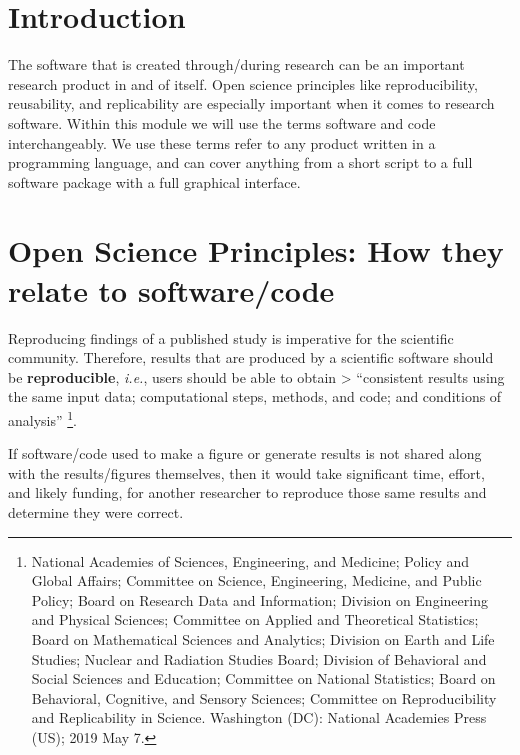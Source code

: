 \documentclass[
  letterpaper,
  DIV=11,
  numbers=noendperiod]{scrreport}
\begin{document}
\hypertarget{introduction-4}{%
\section{Introduction}\label{introduction-4}}

The software that is created through/during research can be an important
research product in and of itself. Open science principles like
reproducibility, reusability, and replicability are especially important
when it comes to research software. Within this module we will use the
terms software and code interchangeably. We use these terms refer to any
product written in a programming language, and can cover anything from a
short script to a full software package with a full graphical interface.

\hypertarget{open-science-principles-how-they-relate-to-softwarecode}{%
\section{Open Science Principles: How they relate to
software/code}\label{open-science-principles-how-they-relate-to-softwarecode}}

Reproducing findings of a published study is imperative for the
scientific community. Therefore, results that are produced by a
scientific software should be \textbf{reproducible}, \emph{i.e.}, users
should be able to obtain \textgreater{} ``consistent results using the
same input data; computational steps, methods, and code; and conditions
of analysis'' \footnote{National Academies of Sciences, Engineering, and
  Medicine; Policy and Global Affairs; Committee on Science,
  Engineering, Medicine, and Public Policy; Board on Research Data and
  Information; Division on Engineering and Physical Sciences; Committee
  on Applied and Theoretical Statistics; Board on Mathematical Sciences
  and Analytics; Division on Earth and Life Studies; Nuclear and
  Radiation Studies Board; Division of Behavioral and Social Sciences
  and Education; Committee on National Statistics; Board on Behavioral,
  Cognitive, and Sensory Sciences; Committee on Reproducibility and
  Replicability in Science. Washington (DC): National Academies Press
  (US); 2019 May 7.}.

If software/code used to make a figure or generate results is not shared
along with the results/figures themselves, then it would take
significant time, effort, and likely funding, for another researcher to
reproduce those same results and determine they were correct.
\end{document}
